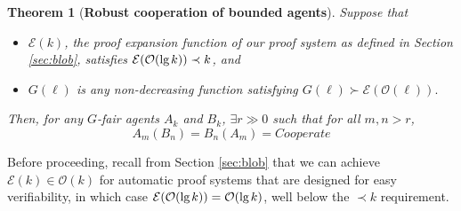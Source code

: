 \documentclass[onecolumn]{miri-tech-article}
\newtheorem{theorem}{Theorem}
\numberwithin{equation}{section}
\theoremstyle{definition}
\newcommand{\Ee}{\mathcal{E}}
\newcommand{\Oo}{\mathcal{O}}
\renewcommand{\lg}{\mathrm{lg\hspace{0.3ex}}}
\renewcommand{\-}{^{-1}}
\begin{document}
\begin{theorem}[{\bf Robust cooperation of bounded agents}]\label{thm:rc}Suppose that 
\begin{itemize}
\item $\Ee(k)$, the proof expansion function of our proof system as defined in Section \ref{sec:blob}, satisfies $\Ee (\Oo(\lg k)) \prec k$, and
\item $G(\ell)$ is any non-decreasing function satisfying $G(\ell) \succ \Ee(\Oo(\ell)).$
\end{itemize}
Then, for any $G$-fair agents $A_k$ and $B_k$, $\exists r \gg 0$ such that for all $m,n>r$,
$$A_m(B_n) = B_n(A_m) = Cooperate$$
\end{theorem}

 Before proceeding, recall from Section \ref{sec:blob} that we can achieve $\Ee(k) \in \Oo(k)$ for automatic proof systems that are designed for easy verifiability, in which case $\Ee(\Oo(\lg k)) = \Oo(\lg k)$, well below the $\prec k$ requirement.
\end{document}
